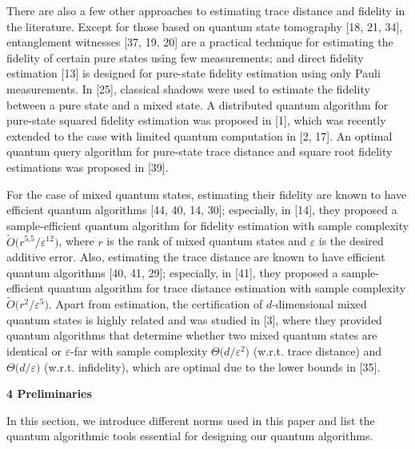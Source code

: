 \documentclass[10pt,a4paper]{article}
\begin{document}
There are also a few other approaches to estimating trace distance and fidelity in the literature.
Except for those based on quantum state tomography [18, 21, 34], entanglement witnesses [37, 19, 20] are a practical technique for estimating the fidelity of certain pure states using few measurements;
and direct fidelity estimation [13] is designed for pure-state fidelity estimation using only Pauli measurements.
In [25], classical shadows were used to estimate the fidelity between a pure state and a mixed state.
A distributed quantum algorithm for pure-state squared fidelity estimation was proposed in [1], which was recently extended to the case with limited quantum computation in [2, 17].
An optimal quantum query algorithm for pure-state trace distance and square root fidelity estimations was proposed in [39].\par




For the case of mixed quantum states, estimating their fidelity are known to have efficient quantum algorithms [44, 40, 14, 30]; especially, in [14], they proposed a sample-efficient quantum algorithm for fidelity estimation with sample complexity $\widetilde{O}\lparen r^{5.5}/\varepsilon^{12}\rparen$, where $r$ is the rank of mixed quantum states and $\varepsilon$ is the desired additive error.
Also, estimating the trace distance are known to have efficient quantum algorithms [40, 41, 29]; especially, in [41], they proposed a sample-efficient quantum algorithm for trace distance estimation with sample complexity $\widetilde{O}\lparen r^{2}/\varepsilon^{5}\rparen$.
Apart from estimation, the certification of $d$-dimensional mixed quantum states is highly related and was studied in [3], where they provided quantum algorithms that determine whether two mixed quantum states are identical or $\varepsilon$-far with sample complexity $\Theta\lparen d/\varepsilon^{2}\rparen$ (w.r.t. trace distance) and $\Theta\lparen d/\varepsilon\rparen$ (w.r.t. infidelity), which are optimal due to the lower bounds in [35].\par





\par\medskip\noindent\textbf{
4 Preliminaries}\par




In this section, we introduce different norms used in this paper and list the quantum algorithmic tools essential for designing our quantum algorithms.\par
\end{document}
